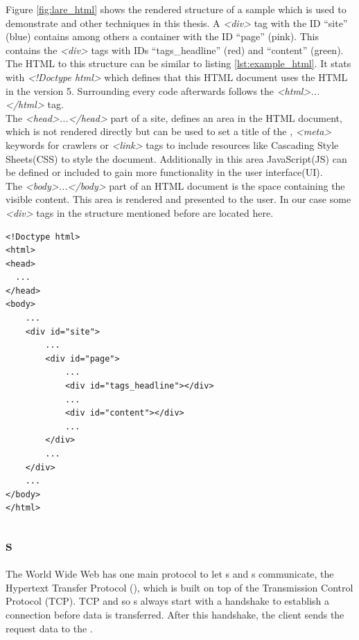 \noindent{}Figure \ref{fig:lare_html} shows the rendered structure of a sample \webApplication{} which is used to demonstrate \lare{} and other techniques in this thesis.
A \emph{<div>} tag with the ID \enquote{site} (blue) contains among others a container with the ID \enquote{page} (pink).
This contains the \emph{<div>} tags with IDs \enquote{tags\_headline} (red) and \enquote{content} (green).
\\
The HTML to this structure can be similar to listing \ref{lst:example_html}. It stats with \emph{<!Doctype html>} which defines that this HTML document uses the HTML in the version 5.
Surrounding every code afterwards follows the \emph{<html>...</html>} tag.
\\
The \emph{<head>...</head>} part of a site, defines an area in the HTML document, which is not rendered directly but can be used to set a title of the \webPage{}, \emph{<meta>} keywords for crawlers or \emph{<link>} tags to include resources like Cascading Style Sheets(CSS) to style the document.
Additionally in this area JavaScript(JS) can be defined or included to gain more functionality in the user interface(UI).
\\
The \emph{<body>...</body>} part of an HTML document is the space containing the visible content.
This area is rendered and presented to the user.
In our case some \emph{<div>} tags in the structure mentioned before are located here.

\begin{minipage}[c]{0.95\linewidth}
\begin{lstlisting}[caption=Sample HTML document, label=lst:example_html]
<!Doctype html>
<html>
<head>
  ...
</head>
<body>
    ...
    <div id="site">
        ...
        <div id="page">
            ...
            <div id="tags_headline"></div>
            ...
            <div id="content"></div>
            ...
        </div>
        ...
    </div>
    ...
</body>
</html>
\end{lstlisting}
\end{minipage}
\subsection{\httpRequest{}s\label{httpRequest}}
The World Wide Web has one main protocol to let \webBrowser{}s and \webServer{}s communicate, the Hypertext Transfer Protocol (\http{}), which is built on top of the Transmission Control Protocol (TCP).
TCP and so \httpRequest{}s always start with a handshake to establish a connection before data is transferred.
After this handshake, the client sends the request data to the \webServer{}.

